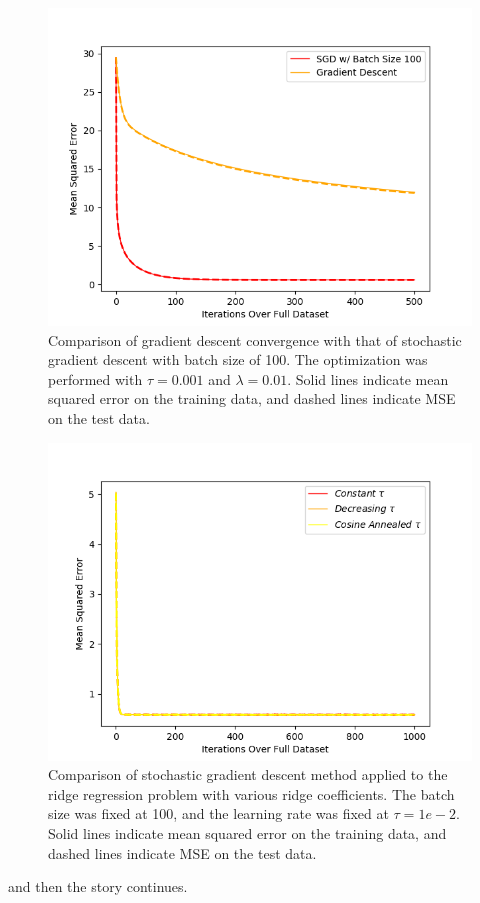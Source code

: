\documentclass{article}
\begin{document}
\begin{figure}[h!]
\centerline{
\includegraphics[width= 18cm]{img/problem_3/algo_comparison.png}
}
\caption{\label{fig:fig5}Comparison of gradient descent convergence with that of stochastic gradient descent with batch size of 100. The optimization was performed with $\tau = 0.001$ and $\lambda = 0.01$. Solid lines indicate mean squared error on the training data, and dashed lines indicate MSE on the test data.}
\end{figure}

\begin{figure}[h!]
\centerline{
\includegraphics[width= 18cm]{img/problem_4/dynamic_time_stepping.png}
}
\caption{\label{fig:fig6}Comparison of stochastic gradient descent method applied to the ridge regression problem with various ridge coefficients. The batch size was fixed at 100, and the learning rate was fixed at $\tau=1e- 2$. Solid lines indicate mean squared error on the training data, and dashed lines indicate MSE on the test data.}
\end{figure}

and then the story continues.
\end{document}

